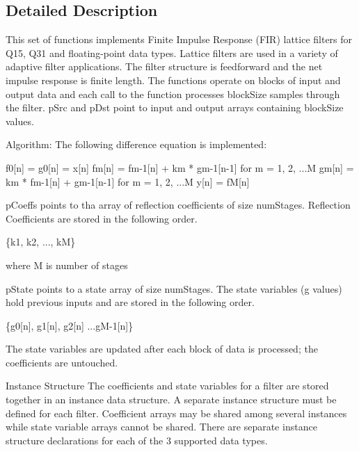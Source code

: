\subsection{Detailed Description}
This set of functions implements Finite Impulse Response (F\-I\-R) lattice filters for Q15, Q31 and floating-\/point data types. Lattice filters are used in a variety of adaptive filter applications. The filter structure is feedforward and the net impulse response is finite length. The functions operate on blocks of input and output data and each call to the function processes {\ttfamily block\-Size} samples through the filter. {\ttfamily p\-Src} and {\ttfamily p\-Dst} point to input and output arrays containing {\ttfamily block\-Size} values.

\begin{DoxyParagraph}{Algorithm\-: }
 The following difference equation is implemented\-: 
\begin{DoxyPre}    
     f0[n] = g0[n] = x[n]    
     fm[n] = fm-1[n] + km * gm-1[n-1] for m = 1, 2, ...M    
     gm[n] = km * fm-1[n] + gm-1[n-1] for m = 1, 2, ...M    
     y[n] = fM[n]    
  \end{DoxyPre}
 
\end{DoxyParagraph}
\begin{DoxyParagraph}{}
{\ttfamily p\-Coeffs} points to tha array of reflection coefficients of size {\ttfamily num\-Stages}. Reflection Coefficients are stored in the following order. 
\end{DoxyParagraph}
\begin{DoxyParagraph}{}

\begin{DoxyPre}    
     \{k1, k2, ..., kM\}    
  \end{DoxyPre}
 where M is number of stages 
\end{DoxyParagraph}
\begin{DoxyParagraph}{}
{\ttfamily p\-State} points to a state array of size {\ttfamily num\-Stages}. The state variables (g values) hold previous inputs and are stored in the following order. 
\begin{DoxyPre}    
     \{g0[n], g1[n], g2[n] ...gM-1[n]\}    
  \end{DoxyPre}
 The state variables are updated after each block of data is processed; the coefficients are untouched. 
\end{DoxyParagraph}
\begin{DoxyParagraph}{Instance Structure }
The coefficients and state variables for a filter are stored together in an instance data structure. A separate instance structure must be defined for each filter. Coefficient arrays may be shared among several instances while state variable arrays cannot be shared. There are separate instance structure declarations for each of the 3 supported data types.
\end{DoxyParagraph}
